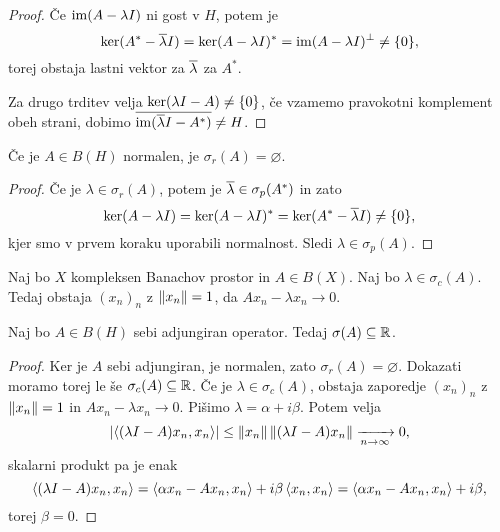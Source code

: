\begin{proof}
  Če $\operatorname{im}(A - \lambda I)$ ni gost v $H$, potem je
  \[
	\operatorname{ker} (A^* - \overline{\lambda} I)
	= \operatorname{ker} (A - \lambda I)^*
	= \operatorname{im} (A - \lambda I)^\bot
	\ne \{0\},
  \]
  torej obstaja lastni vektor za $\overline{\lambda}$ za $A^*$.

  Za drugo trditev velja $\operatorname{ker} (\lambda I -A) \ne \{0\}$, če vzamemo
  pravokotni komplement obeh strani, dobimo $\overline{\operatorname{im} (\overline{\lambda} I - A^*)}
  \ne H$.
\end{proof}


\begin{posledica}
  Če je $A \in B(H)$ normalen, je $\sigma_r(A) = \varnothing$.
\end{posledica}

\begin{proof}
  Če je $\lambda \in \sigma_r(A)$, potem je $\overline{\lambda} \in \sigma_p(A^*)$
  in zato
  \[
	\operatorname{ker} (A - \lambda I) = \operatorname{ker}(A - \lambda I)^*
	= \operatorname{ker}(A^* - \overline{\lambda} I) \ne \{0\},
  \]
  kjer smo v prvem koraku uporabili normalnost.
  Sledi $\lambda \in \sigma_p(A)$.
  \protislovje{}
\end{proof}


\begin{lema}
  Naj bo $X$ kompleksen Banachov prostor in $A \in B(X)$.
  Naj bo $\lambda \in \sigma_c(A)$.
  Tedaj obstaja $(x_n)_n$ z $\left\lVert x_n\right\rVert = 1$, da $A x_n - \lambda x_n \to 0$.
\end{lema}

\begin{izrek}
  Naj bo $A \in B(H)$ sebi adjungiran operator.
  Tedaj $\sigma(A) \subseteq \mathbb{R}$.
\end{izrek}

\begin{proof}
  Ker je $A$ sebi adjungiran, je normalen, zato $\sigma_r(A) = \varnothing$.
  Dokazati moramo torej le še $\sigma_c(A) \subseteq \mathbb{R}$.
  Če je $\lambda \in \sigma_c(A)$, obstaja zaporedje $(x_n)_n$ z $\left\lVert x_n\right\rVert = 1$
  in $A x_n - \lambda x_n \to 0$.
  Pišimo $\lambda = \alpha + i \beta$.
  Potem velja
  \[
	\left| \left< (\lambda I - A) x_n, x_n \right> \right|
	\le \left\lVert x_n\right\rVert \left\lVert(\lambda I - A) x_n\right\rVert
	\xrightarrow[n \to \infty]{} 0,
  \]
  skalarni produkt pa je enak
  \[
	\left< (\lambda I - A) x_n, x_n \right>
	= \left< \alpha x_n - A x_n, x_n \right> + i \beta \left< x_n, x_n \right>
	= \left< \alpha x_n - A x_n, x_n \right> + i \beta,
  \]
  torej $\beta = 0$.
\end{proof}

